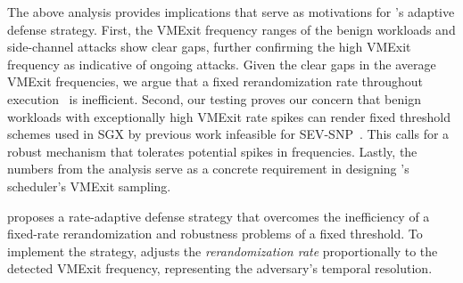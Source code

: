 

The above analysis provides implications that serve as motivations for \thename's adaptive defense strategy.
First, the VMExit frequency ranges of the benign workloads and side-channel attacks show clear gaps, further confirming the high VMExit frequency as indicative of ongoing attacks.
Given the clear gaps in the average VMExit frequencies, we argue that a fixed rerandomization rate throughout execution~\cite{zhang2020klotski} is inefficient.
Second, our testing proves our concern that benign workloads with exceptionally high VMExit rate spikes can render fixed threshold schemes used in SGX by previous work infeasible for SEV-SNP~\cite{oleksenko2018varys,shih2017tsgx}.
This calls for a robust mechanism that tolerates potential spikes in frequencies.
Lastly, the numbers from the analysis serve as a concrete requirement in designing \thename's scheduler's VMExit sampling.

\thename proposes a rate-adaptive defense strategy that overcomes the inefficiency of a fixed-rate rerandomization and robustness problems of a fixed threshold.
To implement the strategy, \thename adjusts the \emph{rerandomization rate} proportionally to the detected VMExit frequency, representing the adversary's temporal resolution.
